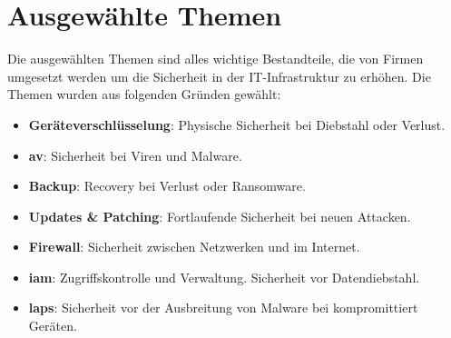 \section{Ausgewählte Themen}
Die ausgewählten Themen sind alles wichtige Bestandteile, die von Firmen umgesetzt werden um die Sicherheit in der IT-Infrastruktur zu erhöhen.
Die Themen wurden aus folgenden Gründen gewählt:

\begin{itemize}
    \item \textbf{Geräteverschlüsselung}: Physische Sicherheit bei Diebstahl oder Verlust.
    \item \textbf{\acrlong{av}}: Sicherheit bei Viren und Malware.
    \item \textbf{Backup}: Recovery bei Verlust oder Ransomware.
    \item \textbf{Updates \& Patching}: Fortlaufende Sicherheit bei neuen Attacken.
    \item \textbf{Firewall}: Sicherheit zwischen Netzwerken und im Internet.
    \item \textbf{\acrshort{iam}}: Zugriffskontrolle und Verwaltung. Sicherheit vor Datendiebstahl.
    \item \textbf{\acrshort{laps}}: Sicherheit vor der Ausbreitung von Malware bei kompromittiert Geräten.
\end{itemize}